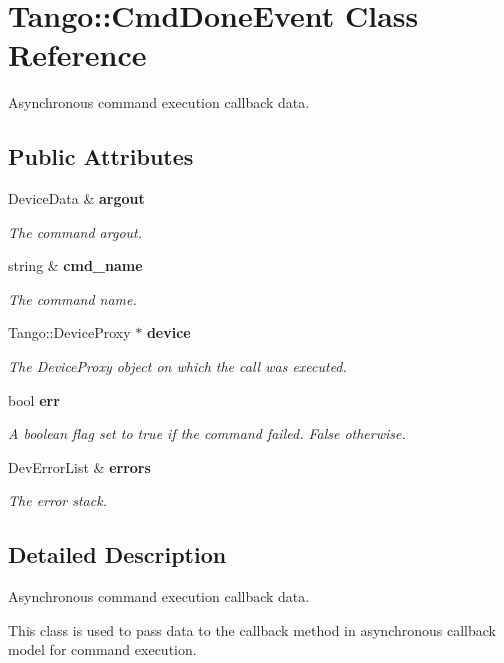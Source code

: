 \section{Tango\-:\-:Cmd\-Done\-Event Class Reference}
\label{classTango_1_1CmdDoneEvent}


Asynchronous command execution callback data.  


\subsection*{Public Attributes}
\begin{DoxyCompactItemize}
\item 
Device\-Data \& {\bf argout}
\begin{DoxyCompactList}\small\item\em The command argout. \end{DoxyCompactList}\item 
string \& {\bf cmd\-\_\-name}
\begin{DoxyCompactList}\small\item\em The command name. \end{DoxyCompactList}\item 
Tango\-::\-Device\-Proxy $\ast$ {\bf device}
\begin{DoxyCompactList}\small\item\em The Device\-Proxy object on which the call was executed. \end{DoxyCompactList}\item 
bool {\bf err}
\begin{DoxyCompactList}\small\item\em A boolean flag set to true if the command failed. False otherwise. \end{DoxyCompactList}\item 
Dev\-Error\-List \& {\bf errors}
\begin{DoxyCompactList}\small\item\em The error stack. \end{DoxyCompactList}\end{DoxyCompactItemize}


\subsection{Detailed Description}
Asynchronous command execution callback data. 

This class is used to pass data to the callback method in asynchronous callback model for command execution.

